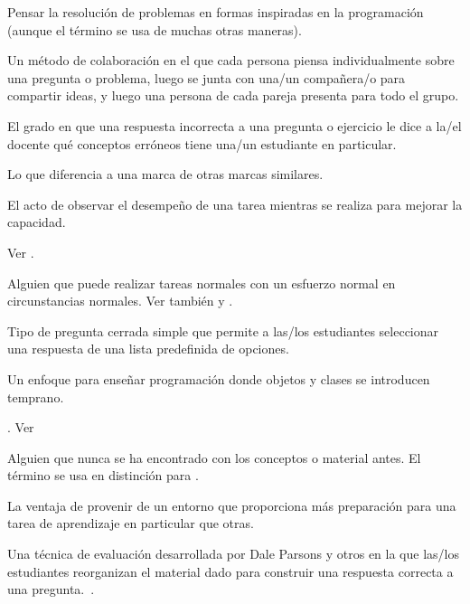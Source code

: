 \begin{description}
 Pensar la
resolución de problemas en formas inspiradas en la programación (aunque el término se usa de muchas otras maneras).

 Un método de colaboración
en el que cada persona piensa individualmente sobre una pregunta o problema,
luego se junta con una/un compañera/o para compartir ideas, y luego una persona de
cada pareja presenta para todo el grupo.

 El grado en que una respuesta incorrecta
a una pregunta o ejercicio le dice a la/el docente qué conceptos erróneos tiene una/un estudiante en particular.

 Lo que diferencia a una marca de otras
marcas similares.

 El acto de observar el desempeño
de una tarea mientras se realiza para mejorar la capacidad.

Ver .

 Alguien que puede
realizar tareas normales con un esfuerzo normal en circunstancias normales. Ver también
 y .

 Tipo de pregunta cerrada simple que permite 
a las/los estudiantes seleccionar una respuesta de una lista predefinida de opciones.

 Un enfoque para enseñar programación donde
objetos y clases se introducen temprano.

. Ver 

 Alguien que nunca se ha
encontrado con los conceptos o material antes. El término se usa en distinción para
.

 La ventaja de provenir de un entorno que proporciona más 
preparación para una tarea de aprendizaje en particular que otras.

 Una técnica de evaluación desarrollada
por Dale Parsons y otros en la que las/los estudiantes reorganizan el material dado
para construir una respuesta correcta a una pregunta.~\cite{Pars2006}.


\end{description}
